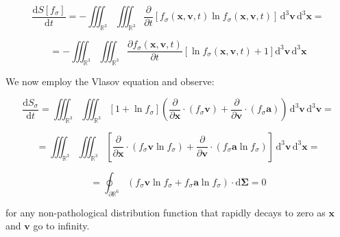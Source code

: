 \begin{equation}
    \frac{\mathrm{d}S[f_\sigma]}{\mathrm{d}t}=-\iiint_{\mathbb{R}^3}\iiint_{\mathbb{R}^3}\frac{\partial}{\partial t}\left[f_\sigma(\mathbf{x},\mathbf{v},t)\ln{f_\sigma(\mathbf{x},\mathbf{v},t)}\right]\,\mathrm{d}^3\mathbf{v}\,\mathrm{d}^3\mathbf{x}=
\end{equation}

\begin{equation}
    =-\iiint_{\mathbb{R}^3}\iiint_{\mathbb{R}^3}\frac{\partial f_\sigma(\mathbf{x},\mathbf{v},t)}{\partial t}\left[\ln{f}_\sigma(\mathbf{x},\mathbf{v},t)+1\right]\mathrm{d}^3\mathbf{v}\,\mathrm{d}^3\mathbf{x}
\end{equation}

We now employ the Vlasov equation and observe:

\begin{equation}
    \frac{\mathrm{d}S_\sigma}{\mathrm{d}t}=\iiint_{\mathbb{R}^3}\iiint_{\mathbb{R}^3}\left[1+\ln{f_\sigma}\right]\left(\frac{\partial}{\partial\mathbf{x}}\cdot(f_\sigma\mathbf{v})+\frac{\partial}{\partial\mathbf{v}}\cdot(f_\sigma\mathbf{a})\right)\,\mathrm{d}^3\mathbf{v}\,\mathrm{d}^3\mathbf{v}=
\end{equation}

\begin{equation}
    =\iiint_{\mathbb{R}^3}\iiint_{\mathbb{R}^3}\left[\frac{\partial}{\partial\mathbf{x}}\cdot(f_\sigma\mathbf{v}\ln{f_\sigma})+\frac{\partial}{\partial\mathbf{v}}\cdot(f_\sigma\mathbf{a}\ln{f_\sigma})\right]\,\mathrm{d}^3\mathbf{v}\,\mathrm{d}^3\mathbf{x}=
\end{equation}

\begin{equation}
    =\oint_{\partial\mathbb{R}^6}\left(f_\sigma\mathbf{v}\ln{f_\sigma}+f_\sigma\mathbf{a}\ln{f_\sigma}\right)\cdot\mathrm{d}\boldsymbol{\Sigma}=0
\end{equation}

for any non-pathological distribution function that rapidly decays to zero as $\mathbf{x}$ and $\mathbf{v}$ go to infinity.